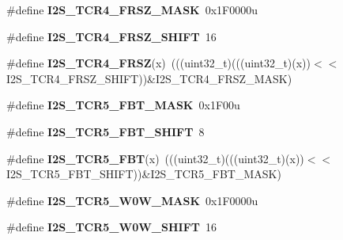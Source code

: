 \begin{DoxyCompactItemize}
\item 
\#define {\bfseries I2\+S\+\_\+\+T\+C\+R4\+\_\+\+F\+R\+S\+Z\+\_\+\+M\+A\+SK}~0x1\+F0000u\hypertarget{group__I2S__Register__Masks_ga1348cbea02cf3f38b5112c2ed27fafa0}{}\label{group__I2S__Register__Masks_ga1348cbea02cf3f38b5112c2ed27fafa0}

\item 
\#define {\bfseries I2\+S\+\_\+\+T\+C\+R4\+\_\+\+F\+R\+S\+Z\+\_\+\+S\+H\+I\+FT}~16\hypertarget{group__I2S__Register__Masks_ga7db678baf12c9937bc1f2899876ed142}{}\label{group__I2S__Register__Masks_ga7db678baf12c9937bc1f2899876ed142}

\item 
\#define {\bfseries I2\+S\+\_\+\+T\+C\+R4\+\_\+\+F\+R\+SZ}(x)~(((uint32\+\_\+t)(((uint32\+\_\+t)(x))$<$$<$I2\+S\+\_\+\+T\+C\+R4\+\_\+\+F\+R\+S\+Z\+\_\+\+S\+H\+I\+FT))\&I2\+S\+\_\+\+T\+C\+R4\+\_\+\+F\+R\+S\+Z\+\_\+\+M\+A\+SK)\hypertarget{group__I2S__Register__Masks_gaadb8adc59ed93d7a11923941424e20e5}{}\label{group__I2S__Register__Masks_gaadb8adc59ed93d7a11923941424e20e5}

\item 
\#define {\bfseries I2\+S\+\_\+\+T\+C\+R5\+\_\+\+F\+B\+T\+\_\+\+M\+A\+SK}~0x1\+F00u\hypertarget{group__I2S__Register__Masks_ga95e32e5df1218cb76b09a99f46d9eca2}{}\label{group__I2S__Register__Masks_ga95e32e5df1218cb76b09a99f46d9eca2}

\item 
\#define {\bfseries I2\+S\+\_\+\+T\+C\+R5\+\_\+\+F\+B\+T\+\_\+\+S\+H\+I\+FT}~8\hypertarget{group__I2S__Register__Masks_gaaeadb079b059ec5d832aa9bce021f0ab}{}\label{group__I2S__Register__Masks_gaaeadb079b059ec5d832aa9bce021f0ab}

\item 
\#define {\bfseries I2\+S\+\_\+\+T\+C\+R5\+\_\+\+F\+BT}(x)~(((uint32\+\_\+t)(((uint32\+\_\+t)(x))$<$$<$I2\+S\+\_\+\+T\+C\+R5\+\_\+\+F\+B\+T\+\_\+\+S\+H\+I\+FT))\&I2\+S\+\_\+\+T\+C\+R5\+\_\+\+F\+B\+T\+\_\+\+M\+A\+SK)\hypertarget{group__I2S__Register__Masks_gae719019b98cc529d200d8570f3b62f05}{}\label{group__I2S__Register__Masks_gae719019b98cc529d200d8570f3b62f05}

\item 
\#define {\bfseries I2\+S\+\_\+\+T\+C\+R5\+\_\+\+W0\+W\+\_\+\+M\+A\+SK}~0x1\+F0000u\hypertarget{group__I2S__Register__Masks_ga8c6552a52f0e99068ae8869056e78ccb}{}\label{group__I2S__Register__Masks_ga8c6552a52f0e99068ae8869056e78ccb}

\item 
\#define {\bfseries I2\+S\+\_\+\+T\+C\+R5\+\_\+\+W0\+W\+\_\+\+S\+H\+I\+FT}~16\hypertarget{group__I2S__Register__Masks_ga0b9f1161cd97d2be7e9ee7f680293e3d}{}\label{group__I2S__Register__Masks_ga0b9f1161cd97d2be7e9ee7f680293e3d}


\end{DoxyCompactItemize}

